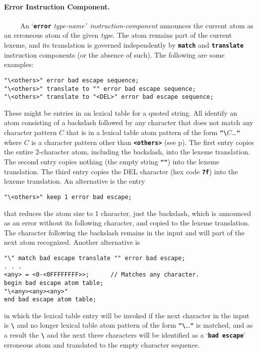 \documentclass[12pt]{article}
\makeatletter
\newcommand{\subsubsubsection}[1]{\paragraph[#1]{#1.}}
\newcommand{\TT}[1]{{\tt \bfseries #1}}
\newcommand{\ttmkey}[2]{\TT{#1}\index{#1@{\tt #1}!#2}}
\newcommand{\pagref}[1]{p\pageref{#1}}
\newenvironment{indpar}[1][0.3in]%
	{\begin{list}{}%
		     {\setlength{\itemsep}{0in}%
		      \setlength{\topsep}{0in}%
		      \setlength{\parsep}{1ex}%
		      \setlength{\labelwidth}{#1}%
		      \setlength{\leftmargin}{#1}%
		      \addtolength{\leftmargin}{\labelsep}}%
	 \item}%
	{\end{list}}
\makeatother
\begin{document}
\subsubsubsection{Error Instruction Component}

~~~~ An `\ttmkey{error}{in lexical program} {\em type-name}\,'
{\em instruction-component}
an\-noun\-ces the current atom as an erroneous atom of the given {\em type}.
The atom remains part of the current lexeme,
and its translation is governed
independently by \TT{match} and \TT{translate} instruction components
(or the absence of such).
The following are some examples:
\begin{indpar}\begin{verbatim}
"\<others>" error bad escape sequence;
"\<others>" translate to "" error bad escape sequence;
"\<others>" translate to "<DEL>" error bad escape sequence;
\end{verbatim}\end{indpar}
These might be entries in an lexical table for a quoted string.
All identify an atom consisting of a backslash followed by any
character that does not match any character pattern $C$ that is in
a lexical table
atom pattern of the form \TT{"\textbackslash}$C$\ldots\TT{"} where $C$ is a character
pattern other than \TT{<others>} (see \pagref{<OTHERS>}).
The first entry copies the entire 2-character atom, including the
backslash, into the lexeme translation.  The second entry copies
nothing (the empty string \TT{""}) into the lexeme translation.
The third entry copies the DEL character (hex code \TT{7f})
into the lexeme translation.  An alternative is the entry
\begin{indpar}\begin{verbatim}
"\<others>" keep 1 error bad escape;
\end{verbatim}\end{indpar}
that reduces the atom size to 1 character, just the backslash,
which is announced as an error without its following character,
and copied to the lexeme translation.  The character following
the backslash remains in the input and will part of the next
atom recognized.
Another alternative is
\begin{indpar}\begin{verbatim}
"\" match bad escape translate "" error bad escape;
. . .
<any> = <0-<0FFFFFFFF>>;      // Matches any character.
begin bad escape atom table;
"\<any><any><any>"
end bad escape atom table;
\end{verbatim}\end{indpar}
in which the lexical table entry will be invoked if the next character
in the input is \TT{\textbackslash} and no longer
lexical table atom pattern of the form \TT{"\textbackslash}\ldots\TT{"} is matched, 
and as a result the \TT{\textbackslash} and the next three characters will be identified
as a `\TT{bad escape}'
erroneous atom and translated to the empty character sequence.
\end{document}
